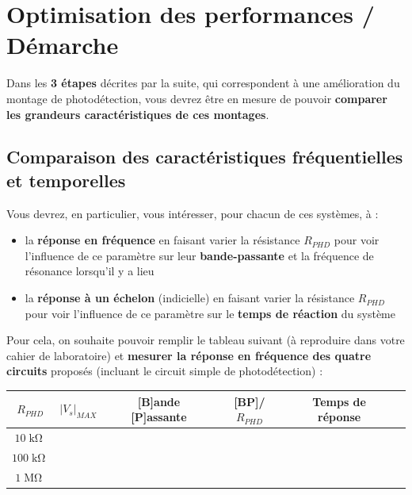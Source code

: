 \clearpage
\section{Optimisation des performances / Démarche}

Dans les \textbf{3 étapes} décrites par la suite, qui correspondent à une amélioration du montage de photodétection, vous devrez être en mesure de pouvoir \textbf{comparer les grandeurs caractéristiques de ces montages}.

\subsection{Comparaison des caractéristiques fréquentielles et temporelles}

Vous devrez, en particulier, vous intéresser, pour chacun de ces systèmes, à :

\begin{itemize}
	\item la \textbf{réponse en fréquence} en faisant varier la résistance $R_{PHD}$ pour voir l'influence de ce paramètre sur leur \textbf{bande-passante} et la fréquence de résonance lorsqu'il y a lieu
	\item la \textbf{réponse à un échelon} (indicielle) en faisant varier la résistance $R_{PHD}$ pour voir l'influence de ce paramètre sur le \textbf{temps de réaction} du système
\end{itemize} 

\medskip

Pour cela, on souhaite pouvoir remplir le tableau suivant (à reproduire dans votre cahier de laboratoire) et \textbf{mesurer la réponse en fréquence des quatre circuits} proposés (incluant le circuit simple de photodétection) :

\medskip

\begin{center}
\begin{tabular}{|c|c|c|c|c|c|}
  \hline
  $R_{PHD}$ & $|V_s|_{MAX}$ & [B]ande [P]assante & [BP]/$R_{PHD}$ & Temps de réponse\\
  \hline
  $10\operatorname{k\Omega}$ & & & & \\
  \hline
  $100\operatorname{k\Omega}$ & & & & \\
  \hline
  $1\operatorname{M\Omega}$ & & & & \\
  \hline
\end{tabular}
\end{center}


